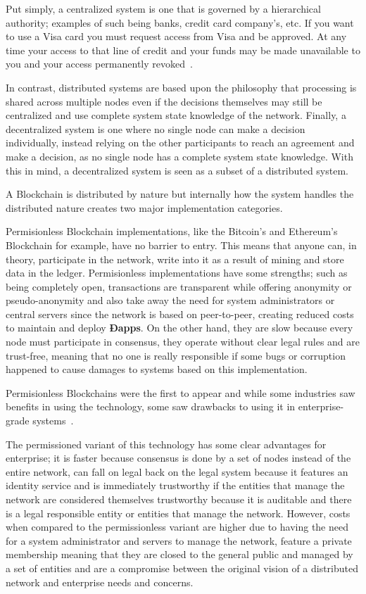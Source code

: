 Put simply, a centralized system is one that is governed by a hierarchical
authority; examples of such being banks, credit card company’s, etc. If you
want to use a Visa card you must request access from Visa and be approved. At
any time your access to that line of credit and your funds may be made
unavailable to you and your access permanently revoked~\cite{Dreifuerst2018}.

In contrast, distributed systems are based upon the philosophy that processing
is shared across multiple nodes even if the decisions themselves may still be
centralized and use complete system state knowledge of the network. Finally, a
decentralized system is one where no single node can make a decision
individually, instead relying on the other participants to reach an agreement
and make a decision, as no single node has a complete system state knowledge.
With this in mind, a decentralized system is seen as a subset of a distributed
system.

A Blockchain is distributed by nature but internally how the system handles the
distributed nature creates two major implementation categories.

Permisionless Blockchain implementations, like the Bitcoin's and Ethereum's
Blockchain for example, have no barrier to entry. This means that anyone can,
in theory, participate in the network, write into it as a result of mining and
store data in the ledger. Permisionless implementations have some strengths;
such as being completely open, transactions are transparent while offering
anonymity or pseudo-anonymity and also take away the need for system
administrators or central servers since the network is based on peer-to-peer,
creating reduced costs to maintain and deploy \textbf{Ðapps}. On the other
hand, they are slow because every node must participate in consensus, they
operate without clear legal rules and are trust-free, meaning that no one is
really responsible if some bugs or corruption happened to cause damages to
systems based on this implementation.

Permisionless Blockchains were the first to appear and while some industries
saw benefits in using the technology, some saw drawbacks to using it in
enterprise-grade systems~\cite{Gopinath2016}.

The permissioned variant of this technology has some clear advantages for
enterprise; it is faster because consensus is done by a set of nodes instead of
the entire network, can fall on legal back on the legal system because it
features an identity service and is immediately trustworthy if the entities
that manage the network are considered themselves trustworthy because it is
auditable and there is a legal responsible entity or entities that manage the
network. However, costs when compared to the permissionless variant are higher
due to having the need for a system administrator and servers to manage the
network, feature a private membership meaning that they are closed to the
general public and managed by a set of entities and are a compromise between
the original vision of a distributed network and enterprise needs and concerns. 

